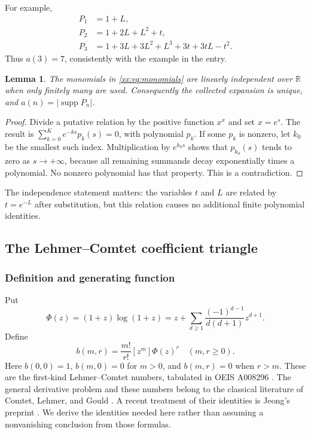 \documentclass[11pt,a4paper]{article}
\numberwithin{equation}{section}
\newtheorem{lemma}[theorem]{Lemma}
\theoremstyle{definition}
\theoremstyle{remark}
\theoremstyle{plain}
\DeclareMathOperator{\supp}{supp}
\newcommand{\R}{\mathbb R}
\newcommand{\coef}[2]{[#1^{#2}]}
\begin{document}
For example,
\begin{align*}
 P_1&=1+L,\\
 P_2&=1+2L+L^2+t,\\
 P_3&=1+3L+3L^2+L^3+3t+3tL-t^2.
\end{align*}
Thus $a(3)=7$, consistently with the example in the entry.

\begin{lemma}\label{xx:lem:independence}
The monomials in \eqref{xx:eq:monomials} are linearly independent over $\R$
when only finitely many are used. Consequently the collected expansion is
unique, and $a(n)=|\supp P_n|$.
\end{lemma}
\begin{proof}
Divide a putative relation by the positive function $x^x$ and set $x=e^s$.
The result is $\sum_{k=0}^K e^{-ks}p_k(s)=0$, with polynomial $p_k$.
If some $p_k$ is nonzero, let $k_0$ be the smallest such index. Multiplication
by $e^{k_0s}$ shows that $p_{k_0}(s)$ tends to zero as $s\to+\infty$, because
all remaining summands decay exponentially times a polynomial. No nonzero
polynomial has that property. This is a contradiction.
\end{proof}

The independence statement matters: the variables $t$ and $L$ are related
by $t=e^{-L}$ after substitution, but this relation causes no additional
finite polynomial identities.

\subsection{The Lehmer--Comtet coefficient triangle}

\subsubsection{Definition and generating function}
Put
\begin{equation}\label{xx:eq:phi}
 \Phi(z)=(1+z)\log(1+z)
 =z+\sum_{d\ge1}\frac{(-1)^{d-1}}{d(d+1)}z^{d+1}.
\end{equation}
Define
\begin{equation}\label{xx:eq:bdef}
 b(m,r)=\frac{m!}{r!}\coef{z}{m}\Phi(z)^r
 \quad(m,r\ge0).
\end{equation}
Here $b(0,0)=1$, $b(m,0)=0$ for $m>0$, and $b(m,r)=0$ when $r>m$.
These are the first-kind Lehmer--Comtet numbers, tabulated in OEIS A008296
\cite{oeis8296}. The general derivative problem and these numbers belong to
the classical literature of Comtet, Lehmer, and Gould
\cite{comtet,lehmer,gould}. A recent treatment of their identities is
Jeong's preprint \cite{jeong}. We derive the identities needed here rather
than assuming a nonvanishing conclusion from those formulas.
\end{document}
